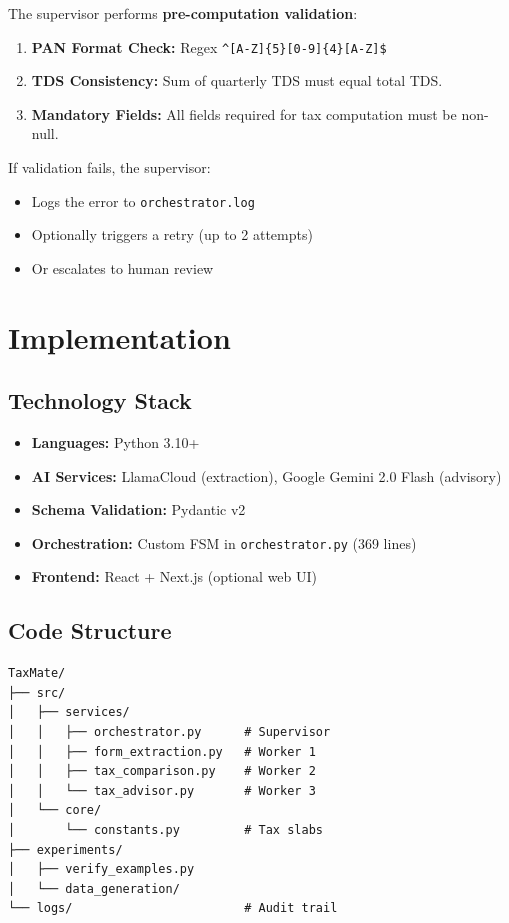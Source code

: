 \documentclass[conference]{IEEEtran}
\begin{document}
The supervisor performs \textbf{pre-computation validation}:

\begin{enumerate}
    \item \textbf{PAN Format Check:} Regex \texttt{\textasciicircum[A-Z]\{5\}[0-9]\{4\}[A-Z]\$}
    \item \textbf{TDS Consistency:} Sum of quarterly TDS must equal total TDS.
    \item \textbf{Mandatory Fields:} All fields required for tax computation must be non-null.
\end{enumerate}

If validation fails, the supervisor:
\begin{itemize}
    \item Logs the error to \texttt{orchestrator.log}
    \item Optionally triggers a retry (up to 2 attempts)
    \item Or escalates to human review
\end{itemize}

\section{Implementation}
\label{sec:implementation}

\subsection{Technology Stack}

\begin{itemize}
    \item \textbf{Languages:} Python 3.10+
    \item \textbf{AI Services:} LlamaCloud (extraction), Google Gemini 2.0 Flash (advisory)
    \item \textbf{Schema Validation:} Pydantic v2
    \item \textbf{Orchestration:} Custom FSM in \texttt{orchestrator.py} (369 lines)
    \item \textbf{Frontend:} React + Next.js (optional web UI)
\end{itemize}

\subsection{Code Structure}

\begin{verbatim}
TaxMate/
├── src/
│   ├── services/
│   │   ├── orchestrator.py      # Supervisor
│   │   ├── form_extraction.py   # Worker 1
│   │   ├── tax_comparison.py    # Worker 2
│   │   └── tax_advisor.py       # Worker 3
│   └── core/
│       └── constants.py         # Tax slabs
├── experiments/
│   ├── verify_examples.py
│   └── data_generation/
└── logs/                        # Audit trail
\end{verbatim}
\end{document}

